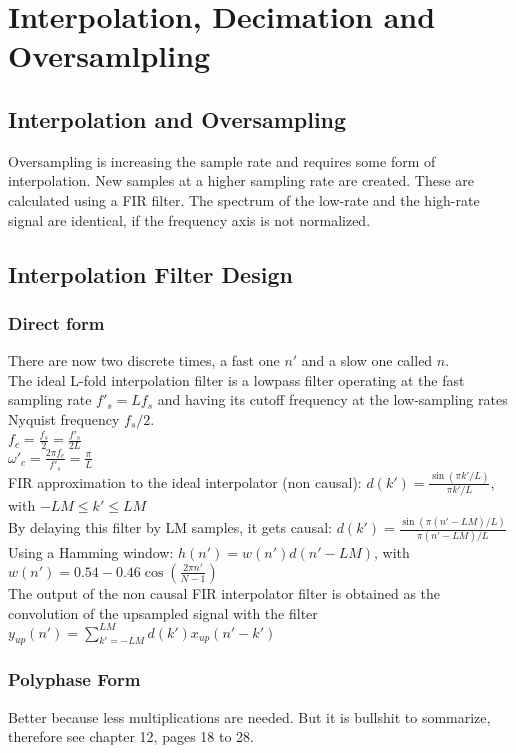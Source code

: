 \section{Interpolation, Decimation and Oversamlpling}
\subsection{Interpolation and Oversampling}
Oversampling is increasing the sample rate and requires some form of interpolation. New samples at a higher sampling rate are created. These are calculated using a FIR filter. The spectrum of the low-rate and the high-rate signal are identical, if the frequency axis is not normalized.

\subsection{Interpolation Filter Design}
\subsubsection{Direct form}
There are now two discrete times, a fast one $n'$ and a slow one called $n$.\\
The ideal L-fold interpolation filter is a lowpass filter operating at the fast sampling rate $f'_s=Lf_s$ and having its cutoff frequency at the low-sampling rates Nyquist frequency $f_s/2$.\\
$f_c=\frac{f_s}{2}=\frac{f'_s}{2L}$\\
$\omega'_c=\frac{2\pi f_c}{f'_s}=\frac{\pi}{L}$\\
FIR approximation to the ideal interpolator (non causal): $d(k')=\frac{\sin(\pi k'/L)}{\pi k'/L}$, with $-LM\leq k'\leq LM$\\
By delaying this filter by LM samples, it gets causal: $d(k')=\frac{\sin(\pi (n'-LM)/L)}{\pi (n'-LM)/L}$\\
Using a Hamming window: $h(n')=w(n')d(n'-LM)$, with $w(n') = 0.54-0.46\cos(\frac{2\pi n'}{N-1})$\\
The output of the non causal FIR interpolator filter is obtained as the convolution of the upsampled signal with the filter $y_{up}(n') = \sum\limits_{k'=-LM}^{LM}d(k')x_{up}(n'-k')$\\
\subsubsection{Polyphase Form}
Better because less multiplications are needed. But it is bullshit to sommarize, therefore see chapter 12, pages 18 to 28.

